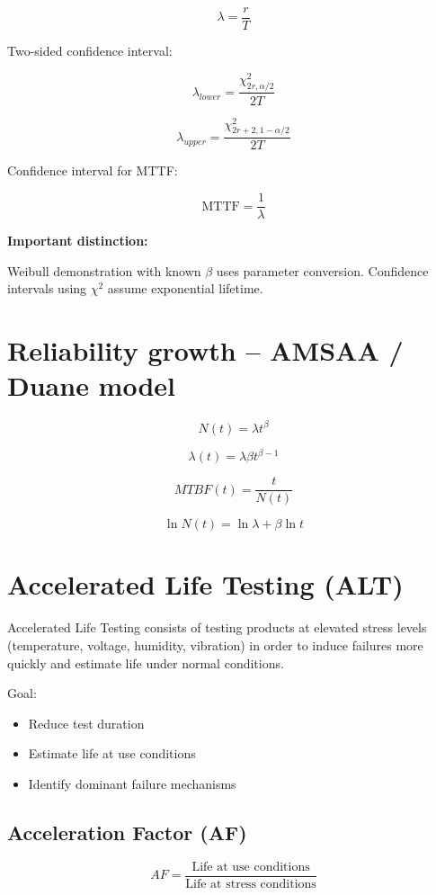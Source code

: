 \documentclass[10pt,a4paper,twocolumn]{article}
\begin{document}
\[\lambda=\frac{r}{T}\]

Two-sided confidence interval:

\[\lambda_{lower}=\frac{\chi^2_{2r,\alpha/2}}{2T}\]

\[\lambda_{upper}=\frac{\chi^2_{2r+2,1-\alpha/2}}{2T}\]

Confidence interval for MTTF:

\[\text{MTTF}=\frac{1}{\lambda}\]

\textbf{Important distinction:}

Weibull demonstration with known $\beta$ uses parameter conversion.
Confidence intervals using $\chi^2$ assume exponential lifetime.
\section*{Reliability growth – AMSAA / Duane model}

\[N(t)=\lambda t^\beta\]

\[\lambda(t)=\lambda\beta t^{\beta-1}\]

\[MTBF(t)=\frac{t}{N(t)}\]

\[\ln N(t)=\ln\lambda+\beta\ln t\]

\section*{Accelerated Life Testing (ALT)}

Accelerated Life Testing consists of testing products at elevated stress
levels (temperature, voltage, humidity, vibration) in order to
induce failures more quickly and estimate life under normal conditions.

Goal:
\begin{itemize}
\item Reduce test duration
\item Estimate life at use conditions
\item Identify dominant failure mechanisms
\end{itemize}

\subsection*{Acceleration Factor (AF)}

\[AF = \frac{\text{Life at use conditions}}{\text{Life at stress conditions}}\]

\end{document}
